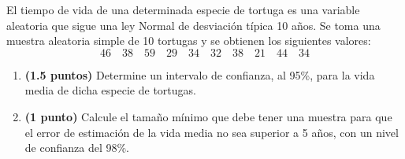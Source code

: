 
El tiempo de vida de una determinada especie de tortuga es una variable aleatoria que sigue una ley Normal de desviación típica 10 años. Se toma una muestra aleatoria simple de 10 tortugas y se obtienen los siguientes valores:
\[
46\quad38\quad59\quad29\quad34\quad32\quad38\quad21\quad44\quad34
\]
\begin{enumerate}[label=\alph*)]
\item \textbf{(1.5 puntos)} Determine un intervalo de confianza, al 95\%, para la vida media de dicha especie de tortugas.
\item \textbf{(1 punto)} Calcule el tamaño mínimo que debe tener una muestra para que el error de estimación de la vida media no sea superior a 5 años, con un nivel de confianza del 98\%.
\end{enumerate}
